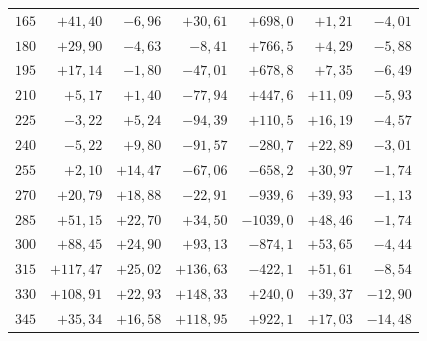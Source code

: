 \begin{center}
\begin{tabular}{r|r|r|r|r|r|r}
\(165\) & \(+41{,}40\) & \(-6{,}96\) & \(+30{,}61\) & \(+698{,}0\) & \(+1{,}21\) & \(-4{,}01\) \\[3pt]
\(180\) & \(+29{,}90\) & \(-4{,}63\) & \(-8{,}41\) & \(+766{,}5\) & \(+4{,}29\) & \(-5{,}88\) \\
\(195\) & \(+17{,}14\) & \(-1{,}80\) & \(-47{,}01\) & \(+678{,}8\) & \(+7{,}35\) & \(-6{,}49\) \\
\(210\) & \(+5{,}17\) & \(+1{,}40\) & \(-77{,}94\) & \(+447{,}6\) & \(+11{,}09\) & \(-5{,}93\) \\
\(225\) & \(-3{,}22\) & \(+5{,}24\) & \(-94{,}39\) & \(+110{,}5\) & \(+16{,}19\) & \(-4{,}57\) \\[3pt]
\(240\) & \(-5{,}22\) & \(+9{,}80\) & \(-91{,}57\) & \(-280{,}7\) & \(+22{,}89\) & \(-3{,}01\) \\
\(255\) & \(+2{,}10\) & \(+14{,}47\) & \(-67{,}06\) & \(-658{,}2\) & \(+30{,}97\) & \(-1{,}74\) \\
\(270\) & \(+20{,}79\) & \(+18{,}88\) & \(-22{,}91\) & \(-939{,}6\) & \(+39{,}93\) & \(-1{,}13\) \\
\(285\) & \(+51{,}15\) & \(+22{,}70\) & \(+34{,}50\) & \(-1039{,}0\) & \(+48{,}46\) & \(-1{,}74\) \\[3pt]
\(300\) & \(+88{,}45\) & \(+24{,}90\) & \(+93{,}13\) & \(-874{,}1\) & \(+53{,}65\) & \(-4{,}44\) \\
\(315\) & \(+117{,}47\) & \(+25{,}02\) & \(+136{,}63\) & \(-422{,}1\) & \(+51{,}61\) & \(-8{,}54\) \\
\(330\) & \(+108{,}91\) & \(+22{,}93\) & \(+148{,}33\) & \(+240{,}0\) & \(+39{,}37\) & \(-12{,}90\) \\
\(345\) & \(+35{,}34\) & \(+16{,}58\) & \(+118{,}95\) & \(+922{,}1\) & \(+17{,}03\) & \(-14{,}48\) \\
\end{tabular}
\end{center}
\endgroup
